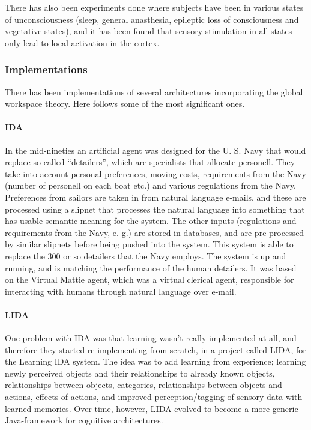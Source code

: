 There has also been experiments done where subjects have been in various states of unconsciousness (sleep, general anasthesia, epileptic loss of consciousness and vegetative states), and it has been found that sensory stimulation in all states only lead to local activation in the cortex.\cite{shanahan2005applying}

\subsubsection{Implementations}
There has been implementations of several architectures incorporating the global workspace theory. Here follows some of the most significant ones.

\paragraph{IDA}
In the mid-nineties an artificial agent was designed for the U. S. Navy that would replace so-called ``detailers'', which are specialists that allocate personell. They take into account personal preferences, moving costs, requirements from the Navy (number of personell on each boat etc.) and various regulations from the Navy. Preferences from sailors are taken in from natural language e-mails, and these are processed using a slipnet that processes the natural language into something that has usable semantic meaning for the system. The other inputs (regulations and requirements from the Navy, e. g.) are stored in databases, and are pre-processed by similar slipnets before being pushed into the system. This system is able to replace the 300 or so detailers that the Navy employs. The system is up and running, and is matching the performance of the human detailers. \cite{baars2007architectural}\cite{franklin1998ida} It was based on the Virtual Mattie agent, which was a virtual clerical agent, responsible for interacting with humans through natural language over e-mail.\cite{franklin1996virtual}

\paragraph{LIDA}
One problem with IDA was that learning wasn't really implemented at all, and therefore they started re-implementing from scratch, in a project called LIDA, for the Learning IDA system. The idea was to add learning from experience; learning newly perceived objects and their relationships to already known objects, relationships between objects, categories, relationships between objects and actions, effects of actions, and improved perception/tagging of sensory data with learned memories.\cite{franklin2006lida} Over time, however, LIDA evolved to become a more generic Java-framework for cognitive architectures.\cite{snaider2011lida}

